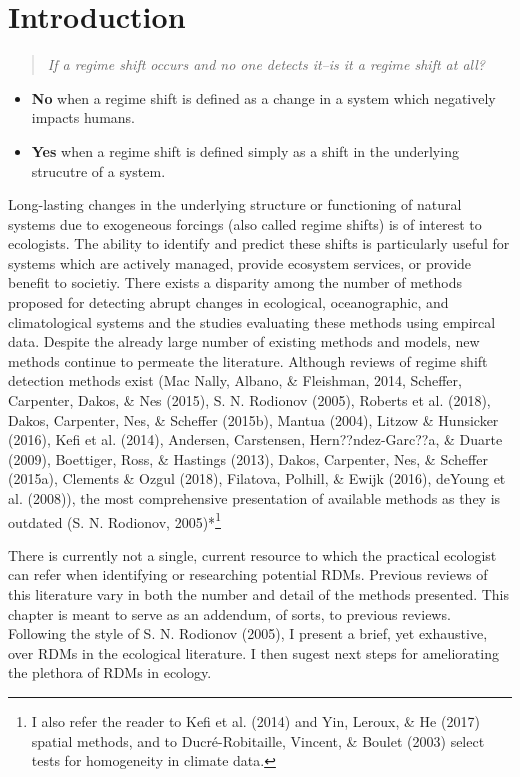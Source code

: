 \documentclass[12pt,twoside,openany]{reedthesis}
\providecommand{\tightlist}{%
  \setlength{\itemsep}{0pt}\setlength{\parskip}{0pt}}
\begin{document}
\section{Introduction}\label{introduction}
\begin{quote}
\emph{If a regime shift occurs and no one detects it--is it a regime
shift at all?}
\end{quote}
\begin{itemize}
\tightlist
\item
  \textbf{No} when a regime shift is defined as a change in a system
  which negatively impacts humans.
\item
  \textbf{Yes} when a regime shift is defined simply as a shift in the
  underlying strucutre of a system.
\end{itemize}
Long-lasting changes in the underlying structure or functioning of
natural systems due to exogeneous forcings (also called regime shifts)
is of interest to ecologists. The ability to identify and predict these
shifts is particularly useful for systems which are actively managed,
provide ecosystem services, or provide benefit to societiy. There exists
a disparity among the number of methods proposed for detecting abrupt
changes in ecological, oceanographic, and climatological systems and the
studies evaluating these methods using empircal data. Despite the
already large number of existing methods and models, new methods
continue to permeate the literature. Although reviews of regime shift
detection methods exist (Mac Nally, Albano, \& Fleishman, 2014,
Scheffer, Carpenter, Dakos, \& Nes (2015), S. N. Rodionov (2005),
Roberts et al. (2018), Dakos, Carpenter, Nes, \& Scheffer (2015b),
Mantua (2004), Litzow \& Hunsicker (2016), Kefi et al. (2014), Andersen,
Carstensen, Hern??ndez-Garc??a, \& Duarte (2009), Boettiger, Ross, \&
Hastings (2013), Dakos, Carpenter, Nes, \& Scheffer (2015a), Clements \&
Ozgul (2018), Filatova, Polhill, \& Ewijk (2016), deYoung et al.
(2008)), the most comprehensive presentation of available methods as
they is outdated (S. N. Rodionov, 2005)*\footnote{I also refer the
  reader to Kefi et al. (2014) and Yin, Leroux, \& He (2017) spatial
  methods, and to Ducré-Robitaille, Vincent, \& Boulet (2003) select
  tests for homogeneity in climate data.}

There is currently not a single, current resource to which the practical
ecologist can refer when identifying or researching potential RDMs.
Previous reviews of this literature vary in both the number and detail
of the methods presented. This chapter is meant to serve as an addendum,
of sorts, to previous reviews. Following the style of S. N. Rodionov
(2005), I present a brief, yet exhaustive, over RDMs in the ecological
literature. I then sugest next steps for ameliorating the plethora of
RDMs in ecology.
\end{document}
